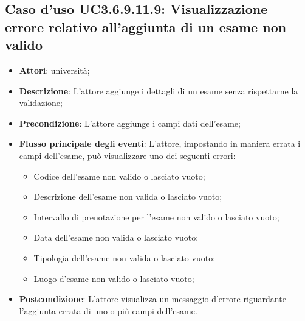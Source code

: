\subsection{Caso d'uso \texorpdfstring{UC3.6.9.11.9}{UC3.6.9.11.9}: Visualizzazione errore relativo all’aggiunta di un esame non valido}
\begin{itemize}
\item \textbf{Attori}: università;
\item \textbf{Descrizione}: L'attore aggiunge i dettagli di un esame senza rispettarne la validazione;

\item \textbf{Precondizione}: L'attore aggiunge i campi dati dell'esame;

\item \textbf{Flusso principale degli eventi}: L'attore, impostando in maniera errata i campi dell'esame, può visualizzare uno dei seguenti errori:
\begin{itemize}
\item Codice dell’esame non valido o lasciato vuoto;
\item Descrizione dell’esame non valida o lasciato vuoto;
\item Intervallo di prenotazione per l’esame non valido o lasciato vuoto;
\item Data dell’esame non valida o lasciato vuoto;
\item Tipologia dell’esame non valida o lasciato vuoto;
\item Luogo d’esame non valido o lasciato vuoto;
\end{itemize}
\item \textbf{Postcondizione}: L'attore visualizza un messaggio d'errore riguardante l'aggiunta errata di uno o più campi dell'esame.

\end{itemize}
